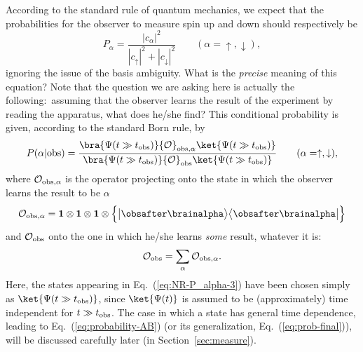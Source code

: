 \documentclass[12pt]{article}
\begin{document}
According to the standard rule of quantum mechanics, we expect that 
the probabilities for the observer to measure spin up and down should 
respectively be
%
\begin{equation}
  P_\alpha = \frac{|c_\alpha|^2}{|c_\uparrow|^2 + |c_\downarrow|^2}
\qquad
  (\alpha = \uparrow,\downarrow),
\label{eq:NR-P_alpha-2}
\end{equation}
%
ignoring the issue of the basis ambiguity.  What is the {\it precise} 
meaning of this equation?  Note that the question we are asking here 
is actually the following:\ assuming that the observer learns the result 
of the experiment by reading the apparatus, what does he/she find? 
This conditional probability is given, according to the standard 
Born rule, by
%
\begin{equation}
  P(\alpha|{\rm obs}) = 
    \frac{\bra{\Psi(t \gg t_{\rm obs})} {\cal O}_{{\rm obs},\alpha} 
      \ket{\Psi(t \gg t_{\rm obs})}}
    {\bra{\Psi(t \gg t_{\rm obs})} {\cal O}_{\rm obs} 
      \ket{\Psi(t \gg t_{\rm obs})}}
\qquad
  (\alpha = \uparrow,\downarrow),
\label{eq:NR-P_alpha-3}
\end{equation}
%
where ${\cal O}_{{\rm obs},\alpha}$ is the operator projecting onto the 
state in which the observer learns the result to be $\alpha$
%
\begin{equation}
  {\cal O}_{{\rm obs},\alpha} 
  = {\bf 1} \otimes {\bf 1} \otimes {\bf 1} \otimes \Bigl\{ 
    \bigl|\obsafter\brainalpha\bigr> \bigl<\obsafter\brainalpha\bigr| \Bigr\}
\label{eq:O_obs-alpha}
\end{equation}
%
and ${\cal O}_{\rm obs}$ onto the one in which he/she learns {\it some} 
result, whatever it is:
%
\begin{equation}
  {\cal O}_{\rm obs} = \sum_\alpha {\cal O}_{{\rm obs},\alpha}.
\label{eq:O_obs-any}
\end{equation}
%
Here, the states appearing in Eq.~(\ref{eq:NR-P_alpha-3}) have been 
chosen simply as $\ket{\Psi(t \gg t_{\rm obs})}$, since $\ket{\Psi(t)}$ 
is assumed to be (approximately) time independent for $t \gg t_{\rm obs}$. 
The case in which a state has general time dependence, leading 
to Eq.~(\ref{eq:probability-AB}) (or its generalization, 
Eq.~(\ref{eq:prob-final})), will be discussed carefully later 
(in Section~\ref{sec:measure}).
\end{document}

